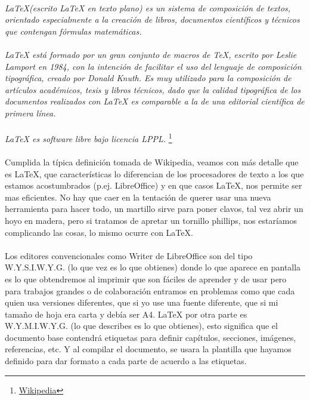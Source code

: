 \paragraph{} \textit{\LaTeX{}(escrito LaTeX en texto plano) es un sistema de composición de textos, orientado especialmente a la creación de libros, documentos científicos y técnicos que contengan fórmulas matemáticas.}
\paragraph{} \textit{\LaTeX{} está formado por un gran conjunto de macros de TeX, escrito por Leslie Lamport en 1984, con la intención de facilitar el uso del lenguaje de composición tipográfica, creado por Donald Knuth. Es muy utilizado para la composición de artículos académicos, tesis y libros técnicos, dado que la calidad tipográfica de los documentos realizados con LaTeX es comparable a la de una editorial científica de primera línea.}
\paragraph{} \textit{ \LaTeX{} es software libre bajo licencia LPPL.} \footnote{\href{http://es.wikipedia.org/wiki/LaTeX}{Wikipedia}}

\paragraph{}Cumplida la típica definición tomada de Wikipedia, veamos con más detalle que es \LaTeX{}, que características lo diferencian de los procesadores de texto a los que estamos acostumbrados (p.ej. LibreOffice) y en que casos \LaTeX{}, nos permite ser mas eficientes. No hay que caer en la tentación de querer usar una nueva herramienta para hacer todo, un martillo sirve para poner clavos, tal vez abrir un hoyo en madera, pero si tratamos de apretar un tornillo phillips, nos estaríamos complicando las cosas, lo mismo ocurre con \LaTeX{}.
\paragraph{}Los editores convencionales como Writer de LibreOffice son del tipo W.Y.S.I.W.Y.G. (lo que vez es lo que obtienes) donde lo que aparece en pantalla es lo que obtendremos al imprimir que son fáciles de aprender y de usar pero para trabajos grandes o de colaboración entramos en problemas como que cada quien usa versiones diferentes, que si yo use una fuente diferente, que si mi tamaño de hoja era carta y debía ser A4. \LaTeX{} por otra parte es W.Y.M.I.W.Y.G. (lo que describes es lo que obtienes), esto significa que el documento base contendrá etiquetas para definir capítulos, secciones, imágenes, referencias, etc. Y al compilar el documento, se usara la plantilla que hayamos definido para dar formato a cada parte de acuerdo a las etiquetas.
